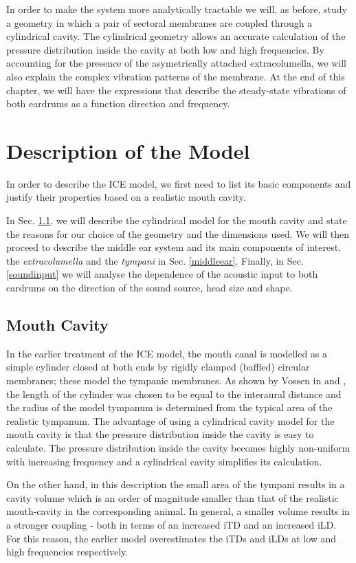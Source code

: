 In order to make the system more analytically tractable we will, as before, study a geometry in which a pair of sectoral
membranes are coupled through a cylindrical cavity. The cylindrical geometry allows an accurate calculation of the 
pressure distribution inside the cavity at both low and high frequencies. By accounting for the presence of the asymetrically attached
extracolumella, we will also explain the complex vibration patterns of the membrane. At the end of this chapter, we will
have the expressions that describe the steady-state vibrations of both eardrums as a function direction and frequency.

\section{Description of the Model}\label{description}
In order to describe the ICE model, we first need to list its basic components and justify their properties
based on a realistic mouth cavity. 

In Sec. \ref{subsecinnercavity}, we will describe the cylindrical model for the mouth cavity and state the reasons
for our choice of the geometry and the dimensions used. We will then proceed to describe the middle
ear system and its main components of interest, the \textit{extracolumella} and the \textit{tympani}
in Sec. \ref{middleear}. Finally, in Sec. \ref{soundinput} we will analyse the dependence of the acoustic input to both
eardrums on the direction of the sound source, head size and shape. 
\subsection{Mouth Cavity}\label{subsecinnercavity}
In the earlier treatment of the ICE model, the mouth canal is modelled as a simple cylinder closed at 
both ends by rigidly clamped (baffled) circular membranes; these model the tympanic membranes. As shown 
by Vossen in \cite[p.~21]{vossenthesis} and \cite{vossenjasa}, the length of the cylinder was chosen to be equal to the interaural distance and the radius of the model tympanum is
determined from the typical area of the realistic tympanum. The advantage of using a cylindrical cavity model for the mouth cavity is that the pressure
distribution inside the cavity is easy to calculate. The pressure distribution inside the cavity becomes highly non-uniform 
with increasing frequency and a cylindrical cavity simplifies its calculation. 

On the other hand, in this description the small area of the tympani results in a cavity volume which 
is an order of magnitude smaller than that of the realistic mouth-cavity in the corresponding animal. In general, a smaller volume results in a stronger coupling - both in terms of an increased iTD and an increased
iLD. For this reason, the earlier model overestimates the iTDs and iLDs at
low and high frequencies respectively.

